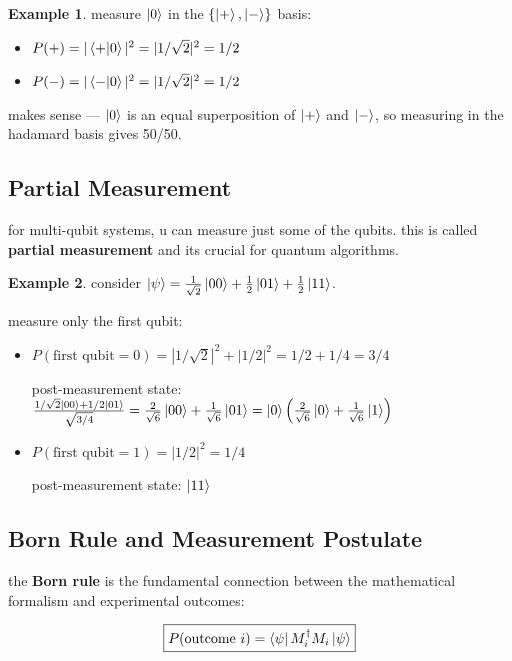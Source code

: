\documentclass[11pt,a4paper]{article}
\theoremstyle{definition}
\newtheorem{example}{Example}[section]
\theoremstyle{remark}
\begin{document}
\begin{example}
measure $\ket{0}$ in the $\{\ket{+}, \ket{-}\}$ basis:
\begin{itemize}
    \item $P(+) = |\braket{+|0}|^2 = |1/\sqrt{2}|^2 = 1/2$
    \item $P(-) = |\braket{-|0}|^2 = |1/\sqrt{2}|^2 = 1/2$
\end{itemize}
makes sense --- $\ket{0}$ is an equal superposition of $\ket{+}$ and $\ket{-}$, so measuring in the hadamard basis gives 50/50.
\end{example}

\subsection{Partial Measurement}

for multi-qubit systems, u can measure just some of the qubits. this is called \textbf{partial measurement} and its crucial for quantum algorithms.

\begin{example}
consider $\ket{\psi} = \frac{1}{\sqrt{2}}\ket{00} + \frac{1}{2}\ket{01} + \frac{1}{2}\ket{11}$.

measure only the first qubit:
\begin{itemize}
    \item $P(\text{first qubit} = 0) = |1/\sqrt{2}|^2 + |1/2|^2 = 1/2 + 1/4 = 3/4$

    post-measurement state: $\frac{1/\sqrt{2}\ket{00} + 1/2\ket{01}}{\sqrt{3/4}} = \frac{2}{\sqrt{6}}\ket{00} + \frac{1}{\sqrt{6}}\ket{01} = \ket{0}\left(\frac{2}{\sqrt{6}}\ket{0} + \frac{1}{\sqrt{6}}\ket{1}\right)$

    \item $P(\text{first qubit} = 1) = |1/2|^2 = 1/4$

    post-measurement state: $\ket{11}$
\end{itemize}
\end{example}

\subsection{Born Rule and Measurement Postulate}

the \textbf{Born rule} is the fundamental connection between the mathematical formalism and experimental outcomes:

\[
\boxed{P(\text{outcome } i) = \bra{\psi}M_i^\dagger M_i\ket{\psi}}
\]
\end{document}
